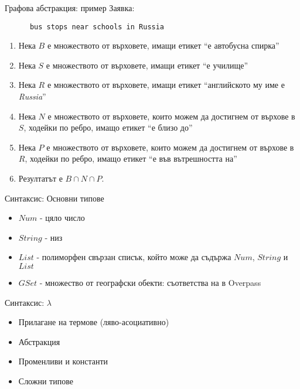 \documentclass[9pt]{beamer}
\begin{document}
  \begin{frame}[fragile]{Графова абстракция: пример}
    Заявка:
    \begin{lstwrap}\begin{lstlisting}
      bus stops near schools in Russia
    \end{lstlisting}\end{lstwrap}

    \begin{enumerate}
      \item Нека $B$ е множеството от върховете, имащи етикет
        ``е автобусна спирка''
      \item Нека $S$ е множеството от върховете, имащи етикет
        ``е училище''
      \item Нека $R$ е множеството от върховете, имащи етикет
        ``английското му име е \emph{Russia}''
      \item Нека $N$ е множеството от върховете, които можем да
        достигнем от върхове в $S$, ходейки по ребро, имащо етикет
        ``е близо до''
      \item Нека $P$ е множеството от върховете, които можем да
        достигнем от върхове в $R$, ходейки по ребро, имащо етикет
        ``е във вътрешността на''
      \item Резултатът е $B \cap N \cap P$.
    \end{enumerate}
  \end{frame}

  \begin{frame}{Синтаксис: Основни типове}
    \begin{itemize}
      \item $Num$ - цяло число \pika
      \item $String$ - низ \pika
      \item $List$ - полиморфен свързан списък, който може
        да съдържа $Num$, $String$ и $List$
      \item $GSet$ - множество от географски обекти: съответства на 
        в Overpass
    \end{itemize}
  \end{frame}

  \begin{frame}{Синтаксис: $\lambda$}
    \begin{itemize}
      \item Прилагане на термове (ляво-асоциативно)
        \begin{center}
        \end{center}
      \item Абстракция
        \begin{center}
        \end{center}
      \item Променливи и константи
      \item Сложни типове
        \begin{center}
        \end{center}
    \end{itemize}
  \end{frame}
\end{document}
